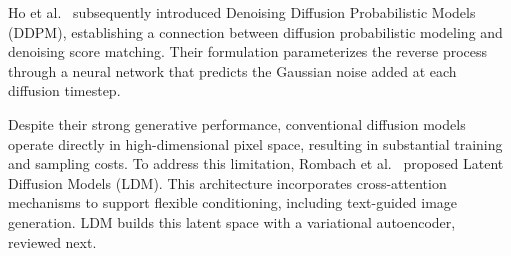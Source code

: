 Ho et al.\ \cite{ho2020ddpm} subsequently introduced Denoising
Diffusion Probabilistic Models (DDPM), establishing a connection
between diffusion probabilistic modeling and denoising score matching.
Their formulation parameterizes the reverse process through a neural
network that predicts the Gaussian noise added at each diffusion
timestep.

Despite their strong generative performance, conventional diffusion
models operate directly in high-dimensional pixel space, resulting
in substantial training and sampling costs. To address this limitation,
Rombach et al.\ \cite{rombach2022ldm} proposed Latent Diffusion Models
(LDM). This architecture incorporates cross-attention mechanisms to support flexible conditioning,
including text-guided image generation.
LDM builds this latent space with a variational autoencoder, reviewed next.

